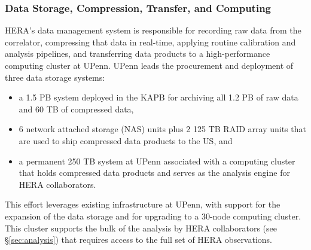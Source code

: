 \documentclass[preprint]{aastex}
\newcommand{\compress}{\vspace{-0.3in}}
\begin{document}


\compress
\subsubsection{Data Storage, Compression, Transfer, and Computing}
\label{sec:data}

HERA's data management system is responsible for recording raw data from the
correlator, compressing that data in real-time, applying routine calibration
and analysis pipelines, and transferring data products to 
a high-performance computing cluster at UPenn.
UPenn leads the procurement
and deployment of three data storage systems:
\begin{itemize}[noitemsep,nolistsep]
\item a 1.5 PB system deployed in the KAPB for archiving all 1.2 PB of raw data and 60 TB of compressed data, 
\item 6 network attached storage (NAS) units plus 2 125 TB RAID array units that are used to ship compressed data products to the US, and
\item a permanent 250 TB system at UPenn associated with a computing cluster that
holds compressed data products and serves as the analysis engine for HERA collaborators.
\end{itemize}
\noindent
This effort leverages existing infrastructure at UPenn, with support
for the expansion of the data storage and for upgrading to a 30-node computing cluster.  This cluster supports the bulk of the analysis by HERA collaborators (see \S\ref{sec:analysis}) that requires access to the full set of HERA observations.

\end{document}
